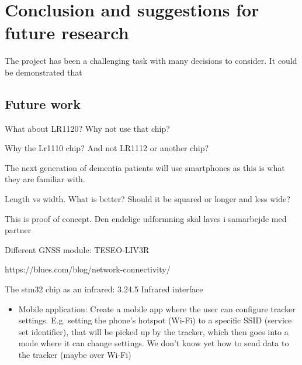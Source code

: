 \section{Conclusion and suggestions for future research} \label{sec:conclusion}

The project has been a challenging task with many decisions to consider. It could be demonstrated that


\subsection{Future work}

What about LR1120? Why not use that chip?


Why the Lr1110 chip? And not LR1112 or another chip?


The next generation of dementia patients will use smartphones as this is what they are familiar with.

Length vs width. What is better? Should it be squared or longer and less wide?

This is proof of concept. Den endelige udformning skal laves i samarbejde med partner

Different GNSS module: TESEO-LIV3R

https://blues.com/blog/network-connectivity/


The stm32 chip as an infrared: 3.24.5 Infrared interface


\begin{itemize}
  \item Mobile application: Create a mobile app where the user can configure tracker settings. E.g. setting the phone's hotspot (Wi-Fi) to a specific \ac{SSID} (service set identifier), that will be picked up by the tracker, which then goes into a mode where it can change settings. We don't know yet how to send data to the tracker (maybe over Wi-Fi)
\end{itemize}